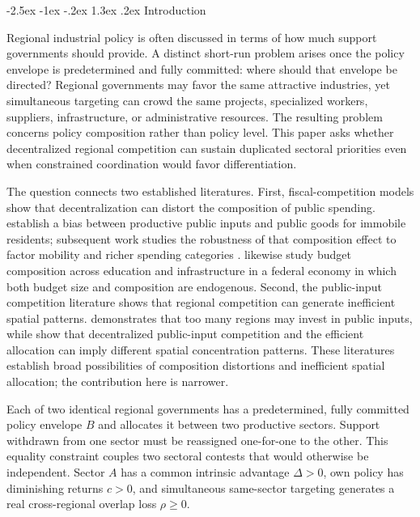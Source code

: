 \documentclass[12pt]{article}
\makeatletter
\renewcommand\section{\@startsection{section}{1}{\z@}%
  {-2.5ex \@plus -1ex \@minus -.2ex}%
  {1.3ex \@plus .2ex}%
  {\centering\normalfont\fontsize{14}{16}\selectfont\bfseries}}
\makeatother
\begin{document}
\section{Introduction}

Regional industrial policy is often discussed in terms of how much support governments should provide. A distinct short-run problem arises once the policy envelope is predetermined and fully committed: where should that envelope be directed? Regional governments may favor the same attractive industries, yet simultaneous targeting can crowd the same projects, specialized workers, suppliers, infrastructure, or administrative resources. The resulting problem concerns policy composition rather than policy level. This paper asks whether decentralized regional competition can sustain duplicated sectoral priorities even when constrained coordination would favor differentiation.

The question connects two established literatures. First, fiscal-competition models show that decentralization can distort the composition of public spending. \citet{keen_marchand_1997} establish a bias between productive public inputs and public goods for immobile residents; subsequent work studies the robustness of that composition effect to factor mobility and richer spending categories \citep{matsumoto_2000,borck_2005,borck_caliendo_steiner_2007}. \citet{arcalean_et_al_2010} likewise study budget composition across education and infrastructure in a federal economy in which both budget size and composition are endogenous. Second, the public-input competition literature shows that regional competition can generate inefficient spatial patterns. \citet{bucovetsky_2005} demonstrates that too many regions may invest in public inputs, while \citet{fenge_ehrlich_wrede_2009} show that decentralized public-input competition and the efficient allocation can imply different spatial concentration patterns. These literatures establish broad possibilities of composition distortions and inefficient spatial allocation; the contribution here is narrower.

Each of two identical regional governments has a predetermined, fully committed policy envelope $B$ and allocates it between two productive sectors. Support withdrawn from one sector must be reassigned one-for-one to the other. This equality constraint couples two sectoral contests that would otherwise be independent. Sector $A$ has a common intrinsic advantage $\Delta>0$, own policy has diminishing returns $c>0$, and simultaneous same-sector targeting generates a real cross-regional overlap loss $\rho\ge0$.
\end{document}
